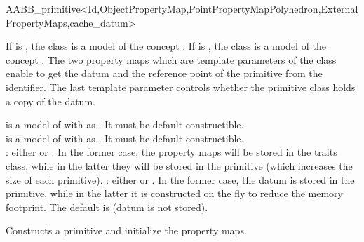 
\begin{ccRefClass}{AABB_primitive<Id,ObjectPropertyMap,PointPropertyMapPolyhedron,ExternalPropertyMaps,cache_datum>}


\ccDefinition
  
If  is , the class is a model of the concept .
If  is , the class is a model of the concept .
The two property maps which are template parameters of the class enable to get the datum and the reference point of 
the primitive from the identifier. The last template parameter controls whether the primitive class holds a copy of the datum.


\ccParameters
{} is a model of 
with  as . It must be default constructible.\\
 is a model of 
with  as . It must be default constructible.\\
: either  or . In the former case, the property maps will be stored in the traits class, while in the latter they will be stored in the primitive (which increases the size of each primitive).
: either  or . In the former case, the datum is stored in the primitive, while in the latter it is constructed on the fly to reduce
the memory footprint. The default is  (datum is not stored).


\ccTypes

\ccGlue
{}
\ccGlue
{}
  
\ccCreation
{}

{Constructs a primitive and initialize the property maps.}
  

\end{ccRefClass}
